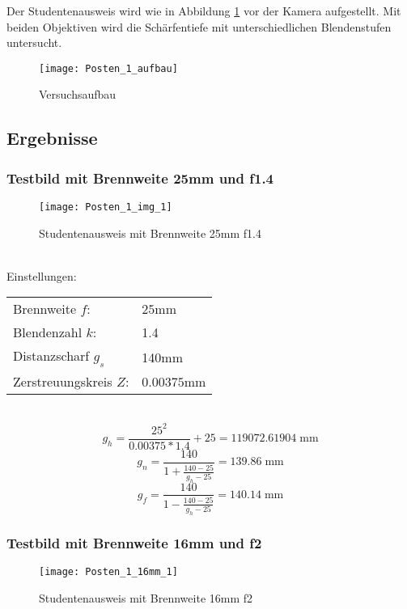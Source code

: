 Der Studentenausweis wird wie in Abbildung \ref{fig:p1auf} vor der Kamera aufgestellt.
Mit beiden Objektiven wird die Schärfentiefe mit unterschiedlichen Blendenstufen untersucht.

\begin{figure}[h!]
  \centering
  \texttt{[image: Posten\_1\_aufbau]}
  \caption{Versuchsaufbau \cite{ref:bver:stefan}}
  \label{fig:p1auf}
\end{figure}

\subsection{Ergebnisse}
\subsubsection{Testbild mit Brennweite 25mm und f1.4}
\begin{wrapfigure}[5]{L}{.6\textwidth}
  \centering
  \texttt{[image: Posten\_1\_img\_1]}
  \caption{Studentenausweis mit Brennweite 25mm f1.4}
  \label{fig:b25f1.4}
\end{wrapfigure}

~\\[2em]
Einstellungen:\\
\begin{tabular}{l l}
  Brennweite $f$:        &  $25$mm\\
  Blendenzahl $k$:       & 1.4 \\
  Distanzscharf $g_s$    & 140mm \\
  Zerstreuungskreis $Z$: & $0.00375$mm\\
\end{tabular}

~\\[10em]

\[
  g_h=\frac{25^2}{0.00375*1.4}+25=119072.61904\;\text{mm}
\]
\[
  g_n=\frac{140}{1+\frac{140-25}{g_h-25}}=139.86\;\text{mm}
\]
\[
  g_f=\frac{140}{1-\frac{140-25}{g_h-25}}=140.14\;\text{mm}
\]

\subsubsection{Testbild mit Brennweite 16mm und f2}
  \begin{wrapfigure}[5]{L}{.6\textwidth}
    \centering
    \texttt{[image: Posten\_1\_16mm\_1]}
    \caption{Studentenausweis mit Brennweite 16mm f2}
    \label{fig:b25f2}
  \end{wrapfigure}

